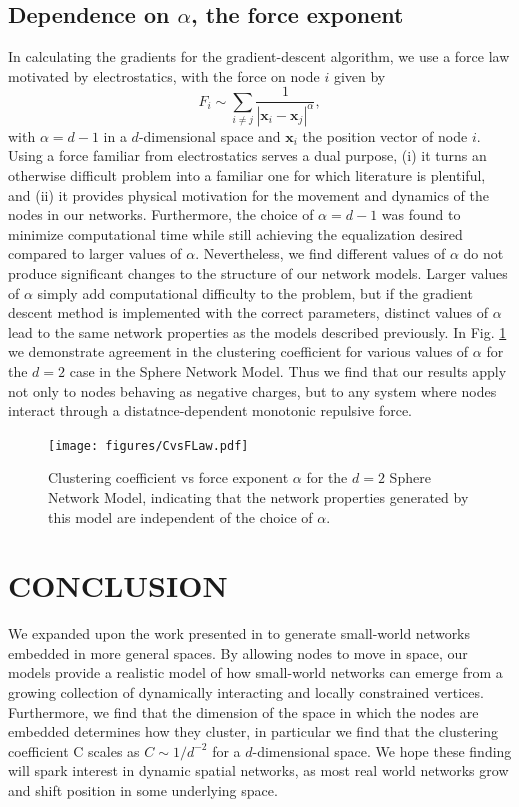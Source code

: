 \documentclass[aps,pre,reprint,superscriptaddress,amsmath,amssymb,nofootinbib]{revtex4-1}
\begin{document}
\subsection{Dependence on $\alpha$, the force exponent}
\label{sub:forcelaw}
In calculating the gradients for the gradient-descent algorithm, we use a force law motivated by electrostatics, with the force on node $i$ given by 
\begin{equation}
F_i \sim \sum_{i \neq j} \frac{1}{|\textbf{x}_i - \textbf{x}_j|^{\alpha}}, 
\end{equation}
with $\alpha = d-1$ in a $d$-dimensional space and $\textbf{x}_i$ the position vector of node $i$.
Using a force familiar from electrostatics serves a dual purpose, (i) it turns an otherwise difficult problem into a familiar one for which literature is plentiful, and (ii) it provides physical motivation for the movement and dynamics of the nodes in our networks.
Furthermore, the choice of $\alpha = d-1$ was found to minimize computational time while still achieving the equalization desired compared to larger values of $\alpha$.
Nevertheless, we find different values of $\alpha$ do not produce significant changes to the structure of our network models.
Larger values of $\alpha$ simply add computational difficulty to the problem, but if the gradient descent method is implemented with the correct parameters, distinct values of $\alpha$ lead to the same network properties as the models described previously.
In Fig. \ref{forcelaw} we demonstrate agreement in the clustering coefficient for various values of $\alpha$ for the $d=2$ case in the Sphere Network Model.
Thus we find that our results apply not only to nodes behaving as negative charges, but to any system where nodes interact through a distatnce-dependent monotonic repulsive force.

\begin{figure}
\texttt{[image: figures/CvsFLaw.pdf]}
\caption{\label{forcelaw}Clustering coefficient vs force exponent $\alpha$ for the $d = 2$ Sphere Network Model, indicating that the network properties generated by this model are independent of the choice of $\alpha$.}
\end{figure}

\section{CONCLUSION}
We expanded upon the work presented in \cite{ozik2004} to generate small-world networks embedded in more general spaces.
By allowing nodes to move in space, our models provide a realistic model of how small-world networks can emerge from a growing collection of dynamically interacting and locally constrained vertices.  
Furthermore, we find that the dimension of the space in which the nodes are embedded determines how they cluster, in particular we find that the clustering coefficient C scales as $C \sim 1/d^{-2}$ for a $d$-dimensional space.
We hope these finding will spark interest in dynamic spatial networks, as most real world networks grow and shift position in some underlying space.


\end{document}
